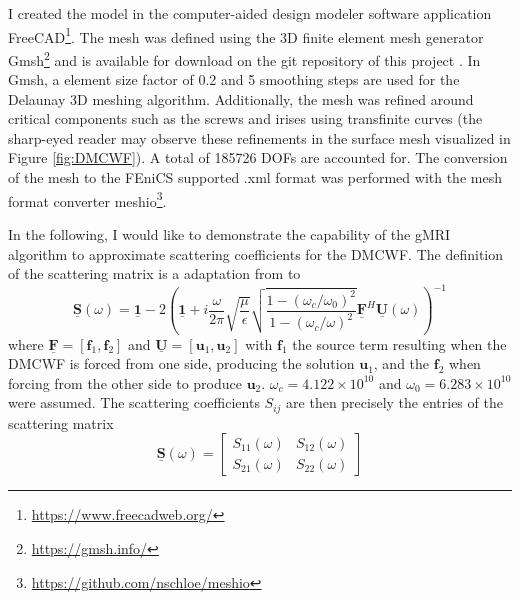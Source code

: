 \documentclass[11pt, a4paper]{article}
\begin{document}
I created the model in the computer-aided design modeler software application
FreeCAD\footnote{\url{https://www.freecadweb.org/}}. The mesh was defined using 
the 3D finite element mesh generator Gmsh\footnote{\url{https://gmsh.info/}} and 
is available for download on the git repository 
of this project \cite{git}. In Gmsh, a element size factor of 0.2 and 5 smoothing steps
are used for the Delaunay 3D meshing algorithm. Additionally, 
the mesh was refined around critical components such as the screws and irises
using transfinite curves (the sharp-eyed reader may observe these refinements
in the surface mesh visualized in Figure \ref{fig:DMCWF}). A total of
185726 \acrshort{DOF}s are accounted for. The conversion of the
mesh to the FEniCS supported .xml format was performed with the mesh format converter
meshio\footnote{\url{https://github.com/nschloe/meshio}}. 

In the following, I would like to demonstrate the capability of the 
\acrshort{gMRI} algorithm to approximate scattering coefficients for the \acrshort{DMCWF}.
The definition of the scattering matrix is a adaptation from \cite{shortMRI} to
\begin{equation}
    \mathbf{\underline{S}}(\omega) = \mathbf{\underline{1}}
    - 2\left( \mathbf{\underline{1}} + i \frac{\omega}{2\pi} \sqrt{\frac{\mu}{\epsilon}}
    \sqrt{\frac{1 - (\omega_c / \omega_0)^2}{1 - (\omega_c / \omega)^2}} 
    \mathbf{\underline{F}}^H \mathbf{\underline{U}}(\omega) \right)^{-1}
\end{equation}
where $\mathbf{\underline{F}} = [\mathbf{f}_1, \mathbf{f}_2]$ and
$\mathbf{\underline{U}} = [\mathbf{u}_1, \mathbf{u}_2]$ with $\mathbf{f}_1$ the source term
resulting when the \acrshort{DMCWF} is forced from one side, producing the
solution $\mathbf{u}_1$, and the $\mathbf{f}_2$ when forcing from the other side to
produce $\mathbf{u}_2$. $\omega_c = 4.122 \times 10^{10}$ and $\omega_0 = 6.283 \times 10^{10}$
were assumed. The scattering coefficients $S_{ij}$ are then precisely the
entries of the scattering matrix
\begin{equation}
    \mathbf{\underline{S}}(\omega) =
    \begin{bmatrix}
            S_{11}(\omega) & S_{12}(\omega) \\
            S_{21}(\omega) & S_{22}(\omega)
    \end{bmatrix}\label{equ:scattering-coefficients}
\end{equation}
\end{document}
